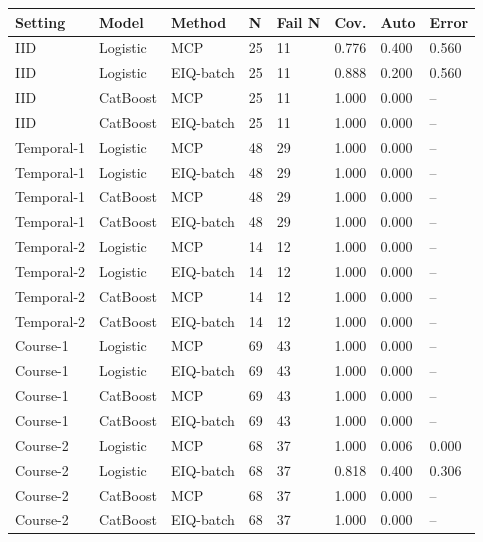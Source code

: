 \begin{tabular}{llllllll}
\toprule
Setting & Model & Method & N & Fail N & Cov. & Auto & Error\\
\midrule
IID & Logistic & MCP & 25 & 11 & 0.776 & 0.400 & 0.560\\
IID & Logistic & EIQ-batch & 25 & 11 & 0.888 & 0.200 & 0.560\\
IID & CatBoost & MCP & 25 & 11 & 1.000 & 0.000 & --\\
IID & CatBoost & EIQ-batch & 25 & 11 & 1.000 & 0.000 & --\\
Temporal-1 & Logistic & MCP & 48 & 29 & 1.000 & 0.000 & --\\
Temporal-1 & Logistic & EIQ-batch & 48 & 29 & 1.000 & 0.000 & --\\
Temporal-1 & CatBoost & MCP & 48 & 29 & 1.000 & 0.000 & --\\
Temporal-1 & CatBoost & EIQ-batch & 48 & 29 & 1.000 & 0.000 & --\\
Temporal-2 & Logistic & MCP & 14 & 12 & 1.000 & 0.000 & --\\
Temporal-2 & Logistic & EIQ-batch & 14 & 12 & 1.000 & 0.000 & --\\
Temporal-2 & CatBoost & MCP & 14 & 12 & 1.000 & 0.000 & --\\
Temporal-2 & CatBoost & EIQ-batch & 14 & 12 & 1.000 & 0.000 & --\\
Course-1 & Logistic & MCP & 69 & 43 & 1.000 & 0.000 & --\\
Course-1 & Logistic & EIQ-batch & 69 & 43 & 1.000 & 0.000 & --\\
Course-1 & CatBoost & MCP & 69 & 43 & 1.000 & 0.000 & --\\
Course-1 & CatBoost & EIQ-batch & 69 & 43 & 1.000 & 0.000 & --\\
Course-2 & Logistic & MCP & 68 & 37 & 1.000 & 0.006 & 0.000\\
Course-2 & Logistic & EIQ-batch & 68 & 37 & 0.818 & 0.400 & 0.306\\
Course-2 & CatBoost & MCP & 68 & 37 & 1.000 & 0.000 & --\\
Course-2 & CatBoost & EIQ-batch & 68 & 37 & 1.000 & 0.000 & --\\
\bottomrule
\end{tabular}